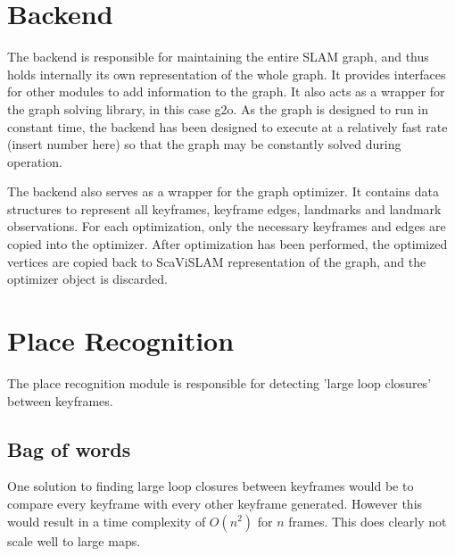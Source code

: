 \section{Backend}
\label{sec:scavislam_backend}

The backend is responsible for maintaining the entire SLAM graph, and thus holds internally its own representation of the whole graph.  It provides interfaces for other modules to add information to the graph. It also acts as a wrapper for the graph solving library, in this case g2o. As the graph is designed to run in constant time, the backend has been designed to execute at a relatively fast rate (insert number here) so that the graph may be constantly solved during operation.


The backend also serves as a wrapper for the graph optimizer.  It contains data structures to represent all keyframes, keyframe edges, landmarks and landmark observations.  For each optimization, only the necessary keyframes and edges are copied into the optimizer.  After optimization has been performed, the optimized vertices are copied back to ScaViSLAM representation of the graph, and the optimizer object is discarded.

\section{Place Recognition}
\label{sec:scavislam_place_recog}

The place recognition module is responsible for detecting 'large loop closures' between keyframes.

\subsection{Bag of words}

One solution to finding large loop closures between keyframes would be to compare every keyframe with every other keyframe generated.  However this would result in a time complexity of $O(n^2)$ for $n$ frames.  This does clearly not scale well to large maps.

